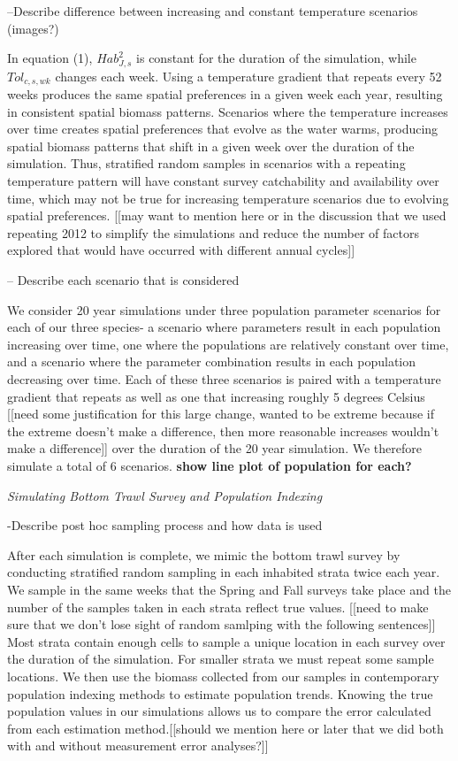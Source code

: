 \documentclass[
  12pt,
]{article}
\begin{document}
--Describe difference between increasing and constant temperature scenarios (images?)

In equation (1), \(Hab^2_{J,s}\) is constant for the duration of the simulation, while \(Tol_{c,s,wk}\) changes each week. Using a temperature gradient that repeats every 52 weeks produces the same spatial preferences in a given week each year, resulting in consistent spatial biomass patterns. Scenarios where the temperature increases over time creates spatial preferences that evolve as the water warms, producing spatial biomass patterns that shift in a given week over the duration of the simulation. Thus, stratified random samples in scenarios with a repeating temperature pattern will have constant survey catchability and availability over time, which may not be true for increasing temperature scenarios due to evolving spatial preferences. {[}{[}may want to mention here or in the discussion that we used repeating 2012 to simplify the simulations and reduce the number of factors explored that would have occurred with different annual cycles{]}{]}

-- Describe each scenario that is considered

We consider 20 year simulations under three population parameter scenarios for each of our three species- a scenario where parameters result in each population increasing over time, one where the populations are relatively constant over time, and a scenario where the parameter combination results in each population decreasing over time. Each of these three scenarios is paired with a temperature gradient that repeats as well as one that increasing roughly 5 degrees Celsius {[}{[}need some justification for this large change, wanted to be extreme because if the extreme doesn't make a difference, then more reasonable increases wouldn't make a difference{]}{]} over the duration of the 20 year simulation. We therefore simulate a total of 6 scenarios. \textbf{show line plot of population for each?}

\emph{Simulating Bottom Trawl Survey and Population Indexing}

-Describe post hoc sampling process and how data is used

After each simulation is complete, we mimic the bottom trawl survey by conducting stratified random sampling in each inhabited strata twice each year. We sample in the same weeks that the Spring and Fall surveys take place and the number of the samples taken in each strata reflect true values. {[}{[}need to make sure that we don't lose sight of random samlping with the following sentences{]}{]} Most strata contain enough cells to sample a unique location in each survey over the duration of the simulation. For smaller strata we must repeat some sample locations. We then use the biomass collected from our samples in contemporary population indexing methods to estimate population trends. Knowing the true population values in our simulations allows us to compare the error calculated from each estimation method.{[}{[}should we mention here or later that we did both with and without measurement error analyses?{]}{]}
\end{document}
